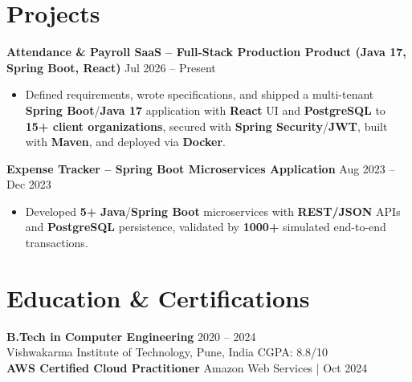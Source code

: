 \documentclass[a4paper,10pt]{article}
\begin{document}
\section*{Projects}

\textbf{Attendance \& Payroll SaaS -- Full-Stack Production Product (Java 17, Spring Boot, React)} \hfill Jul 2026 -- Present
\begin{itemize}[leftmargin=*]
    \item Defined requirements, wrote specifications, and shipped a multi-tenant \textbf{Spring Boot}/\textbf{Java 17} application with \textbf{React} UI and \textbf{PostgreSQL} to \textbf{15+ client organizations}, secured with \textbf{Spring Security}/\textbf{JWT}, built with \textbf{Maven}, and deployed via \textbf{Docker}.
\end{itemize}

\textbf{Expense Tracker -- Spring Boot Microservices Application} \hfill Aug 2023 -- Dec 2023
\begin{itemize}[leftmargin=*]
    \item Developed \textbf{5+} \textbf{Java}/\textbf{Spring Boot} microservices with \textbf{REST/JSON} APIs and \textbf{PostgreSQL} persistence, validated by \textbf{1000+} simulated end-to-end transactions.
\end{itemize}

\section*{Education \& Certifications}
\textbf{B.Tech in Computer Engineering} \hfill 2020 -- 2024 \\
Vishwakarma Institute of Technology, Pune, India \hfill CGPA: 8.8/10 \\
\textbf{AWS Certified Cloud Practitioner} \hfill Amazon Web Services \;|\; Oct 2024
\end{document}
